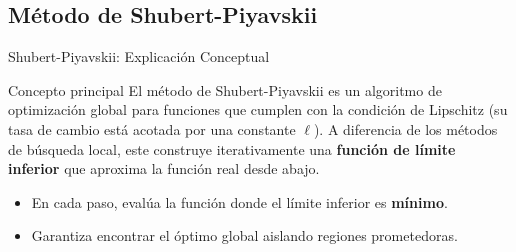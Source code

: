 \subsection{Método de Shubert-Piyavskii}

\begin{frame}{Shubert-Piyavskii: Explicación Conceptual}
    \begin{block}{Concepto principal}
        \footnotesize
        El método de Shubert-Piyavskii es un algoritmo de optimización global para funciones 
        que cumplen con la condición de Lipschitz (su tasa de cambio está acotada por una constante $\ell$). 
        A diferencia de los métodos de búsqueda local, este construye iterativamente una 
        \textbf{función de límite inferior} que aproxima la función real desde abajo.
    \end{block}

    \scriptsize
    \begin{itemize}
        \item En cada paso, evalúa la función donde el límite inferior es \textbf{mínimo}.
        \item Garantiza encontrar el óptimo global aislando regiones prometedoras.
    \end{itemize}
\end{frame}

